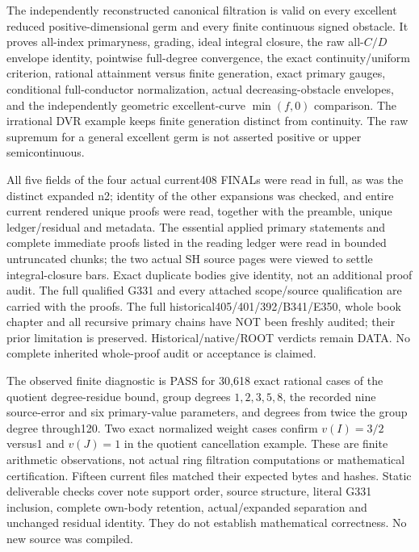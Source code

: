 \documentclass[11pt]{article}
\begin{document}
The independently reconstructed canonical filtration is valid on every excellent reduced positive-dimensional germ and every finite continuous signed obstacle. It proves all-index primaryness, grading, ideal integral closure, the raw all-$C/D$ envelope identity, pointwise full-degree convergence, the exact continuity/uniform criterion, rational attainment versus finite generation, exact primary gauges, conditional full-conductor normalization, actual decreasing-obstacle envelopes, and the independently geometric excellent-curve $\min(f,0)$ comparison. The irrational DVR example keeps finite generation distinct from continuity. The raw supremum for a general excellent germ is not asserted positive or upper semicontinuous.

All five fields of the four actual current408 FINALs were read in full, as was the distinct expanded n2; identity of the other expansions was checked, and entire current rendered unique proofs were read, together with the preamble, unique ledger/residual and metadata. The essential applied primary statements and complete immediate proofs listed in the reading ledger were read in bounded untruncated chunks; the two actual SH source pages were viewed to settle integral-closure bars. Exact duplicate bodies give identity, not an additional proof audit. The full qualified G331 and every attached scope/source qualification are carried with the proofs. The full historical405/401/392/B341/E350, whole book chapter and all recursive primary chains have NOT been freshly audited; their prior limitation is preserved. Historical/native/ROOT verdicts remain DATA. No complete inherited whole-proof audit or acceptance is claimed.

The observed finite diagnostic is PASS for 30,618 exact rational cases of the quotient degree-residue bound, group degrees $1,2,3,5,8$, the recorded nine source-error and six primary-value parameters, and degrees from twice the group degree through120. Two exact normalized weight cases confirm $v(I)=3/2$ versus1 and $v(J)=1$ in the quotient cancellation example. These are finite arithmetic observations, not actual ring filtration computations or mathematical certification. Fifteen current files matched their expected bytes and hashes. Static deliverable checks cover note support order, source structure, literal G331 inclusion, complete own-body retention, actual/expanded separation and unchanged residual identity. They do not establish mathematical correctness. No new source was compiled.
\end{document}
